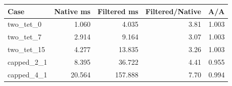 \begin{tabular}{lrrrr}
\toprule
Case & Native ms & Filtered ms & Filtered/Native & A/A \\
\midrule
two\_tet\_0 & 1.060 & 4.035 & 3.81 & 1.003 \\
two\_tet\_7 & 2.914 & 9.164 & 3.07 & 1.003 \\
two\_tet\_15 & 4.277 & 13.835 & 3.26 & 1.003 \\
capped\_2\_1 & 8.395 & 36.722 & 4.41 & 0.955 \\
capped\_4\_1 & 20.564 & 157.888 & 7.70 & 0.994 \\
\bottomrule
\end{tabular}
